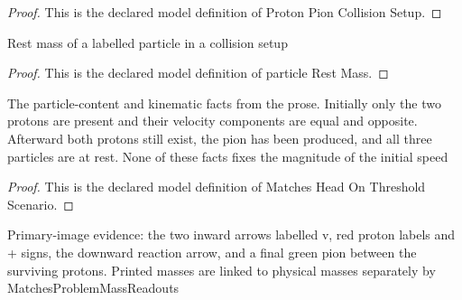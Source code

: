 \begin{proof}
  This is the declared model definition of Proton Pion Collision Setup.
\end{proof}
\begin{definition}
  \label{def:physics:phyx-mini-0511:phyxminiproblems-problemphyxmini0511-particlerestmass}
  Rest mass of a labelled particle in a collision setup
\end{definition}
\begin{proof}
  This is the declared model definition of particle Rest Mass.
\end{proof}
\begin{definition}
  \label{def:physics:phyx-mini-0511:phyxminiproblems-problemphyxmini0511-matchesheadonthresholdscenario}
  The particle-content and kinematic facts from the prose. Initially only the two protons are present and their velocity components are equal and opposite. Afterward both protons still exist, the pion has been produced, and all three particles are at rest. None of these facts fixes the magnitude of the initial speed
\end{definition}
\begin{proof}
  This is the declared model definition of Matches Head On Threshold Scenario.
\end{proof}
\begin{definition}
  \label{def:physics:phyx-mini-0511:phyxminiproblems-problemphyxmini0511-matchessuppliedprotonpionfigure}
  Primary-image evidence: the two inward arrows labelled v, red proton labels and + signs, the downward reaction arrow, and a final green pion between the surviving protons. Printed masses are linked to physical masses separately by MatchesProblemMassReadouts
\end{definition}
